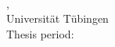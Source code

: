 \thispagestyle{empty}

\makeatletter
\vspace*{\fill}
\begin{flushleft}
\textbf{\@author}\\
\matrikelnummer\\
\emph{\@title}\\
\thesistype, \program\\
Universität Tübingen\\
Thesis period: \thesisperiod
\end{flushleft}